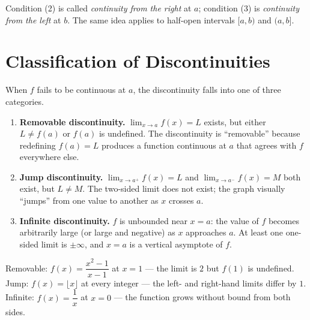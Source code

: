 \begin{remark*}
Condition (2) is called \emph{continuity from the right} at $a$;
condition (3) is \emph{continuity from the left} at $b$.
The same idea applies to half-open intervals $[a, b)$ and $(a, b]$.
\end{remark*}

\section*{Classification of Discontinuities}

\begin{tcolorbox}[colback=propbox, colframe=propborder, arc=2pt,
  left=6pt, right=6pt, top=4pt, bottom=4pt,
  title={\small\textbf{Definition (Types of Discontinuity)}},
  fonttitle=\small\bfseries]
When $f$ fails to be continuous at $a$, the discontinuity falls into
one of three categories.
\begin{enumerate}
  \item \textbf{Removable discontinuity.}
        $\lim_{x \to a} f(x) = L$ exists, but either $L \neq f(a)$
        or $f(a)$ is undefined.
        The discontinuity is ``removable'' because redefining
        $f(a) = L$ produces a function continuous at $a$ that agrees
        with $f$ everywhere else.

  \item \textbf{Jump discontinuity.}
        $\lim_{x \to a^+} f(x) = L$ and $\lim_{x \to a^-} f(x) = M$
        both exist, but $L \neq M$.
        The two-sided limit does not exist; the graph visually
        ``jumps'' from one value to another as $x$ crosses $a$.

  \item \textbf{Infinite discontinuity.}
        $f$ is unbounded near $x = a$: the value of $f$ becomes
        arbitrarily large (or large and negative) as $x$ approaches
        $a$.
        At least one one-sided limit is $\pm\infty$, and $x = a$
        is a vertical asymptote of $f$.
\end{enumerate}
\end{tcolorbox}

\begin{remark*}
Removable: $f(x) = \dfrac{x^2 - 1}{x - 1}$ at $x = 1$ --- the
limit is $2$ but $f(1)$ is undefined.
Jump: $f(x) = \lfloor x \rfloor$ at every integer --- the left- and
right-hand limits differ by $1$.
Infinite: $f(x) = \dfrac{1}{x}$ at $x = 0$ --- the function grows
without bound from both sides.
\end{remark*}

